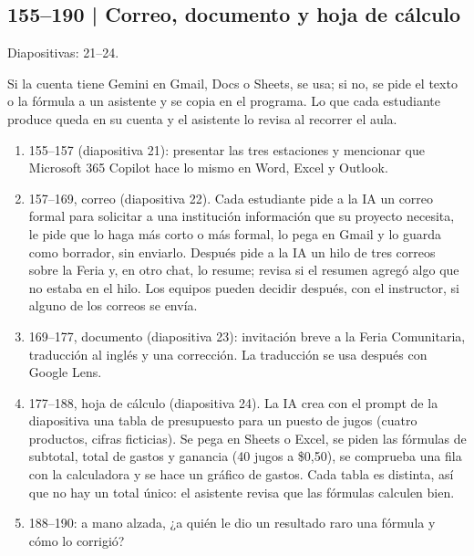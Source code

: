 \documentclass[11pt,a4paper]{article}
\newcommand{\diapos}[1]{\textcolor{gris}{\small\textsf{Diapositivas: #1}}\par}
\begin{document}
\subsection{155--190 | Correo, documento y hoja de cálculo}
\diapos{21--24.}
Si la cuenta tiene Gemini en Gmail, Docs o Sheets, se usa; si no, se pide el texto o la fórmula a un asistente y se copia en el programa. Lo que cada estudiante produce queda en su cuenta y el asistente lo revisa al recorrer el aula.
\begin{enumerate}
\item 155--157 (diapositiva 21): presentar las tres estaciones y mencionar que Microsoft 365 Copilot hace lo mismo en Word, Excel y Outlook.
\item 157--169, correo (diapositiva 22). Cada estudiante pide a la IA un correo formal para solicitar a una institución información que su proyecto necesita, le pide que lo haga más corto o más formal, lo pega en Gmail y lo guarda como borrador, sin enviarlo. Después pide a la IA un hilo de tres correos sobre la Feria y, en otro chat, lo resume; revisa si el resumen agregó algo que no estaba en el hilo. Los equipos pueden decidir después, con el instructor, si alguno de los correos se envía.
\item 169--177, documento (diapositiva 23): invitación breve a la Feria Comunitaria, traducción al inglés y una corrección. La traducción se usa después con Google Lens.
\item 177--188, hoja de cálculo (diapositiva 24). La IA crea con el prompt de la diapositiva una tabla de presupuesto para un puesto de jugos (cuatro productos, cifras ficticias). Se pega en Sheets o Excel, se piden las fórmulas de subtotal, total de gastos y ganancia (40 jugos a \$0,50), se comprueba una fila con la calculadora y se hace un gráfico de gastos. Cada tabla es distinta, así que no hay un total único: el asistente revisa que las fórmulas calculen bien.
\item 188--190: a mano alzada, ¿a quién le dio un resultado raro una fórmula y cómo lo corrigió?
\end{enumerate}
\end{document}
